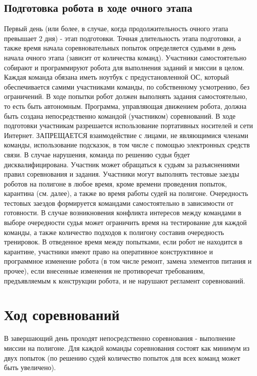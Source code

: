 \documentclass[12pt]{article}
\begin{document}
\subsection{Подготовка робота в ходе очного этапа} \hspace*{1cm}
Первый день (или более, в случае, когда продолжительность очного этапа превышает 2 дня) - этап подготовки. Точная длительность этапа подготовки, а также время начала соревновательных попыток определяется судьями в день начала очного этапа (зависит от количества команд).
Участники самостоятельно собирают и программируют робота для выполнения заданий и миссии в целом. Каждая команда обязана иметь ноутбук с предустановленной ОС, который обеспечивается самими участниками команды, по собственному усмотрению, без ограничений. В ходе попытки робот должен выполнять задания самостоятельно, то есть быть автономным.
Программа, управляющая движением робота, должна быть создана непосредственно командой (участником) соревнований. В ходе подготовки участникам разрешается использование портативных носителей и сети Интернет.
ЗАПРЕЩАЕТСЯ взаимодействие с лицами, не являющимися членами команды, использование подсказок, в том числе с помощью электронных средств связи. В случае нарушения, команда по решению судьи будет дисквалифицирована. Участник может обращаться к судьям за разъяснениями правил соревнования и задания.
Участники могут выполнять тестовые заезды роботов на полигоне в любое время, кроме времени проведения попыток, карантина (см. далее), а также во время работы судей на полигоне.
Очередность тестовых заездов формируется командами самостоятельно в зависимости от готовности. В случае возникновения конфликта интересов между командами в выборе очередности судья может ограничить время на тестирование для каждой команды, а также количество подходов к полигону составив очередность тренировок.
В отведенное время между попытками, если робот не находится в карантине, участники имеют право на оперативное конструктивное и программное изменение робота (в том числе ремонт, замена элементов питания и прочее), если внесенные изменения не противоречат требованиям, предъявляемым к конструкции робота, и не нарушают регламент соревнований.

\section{Ход соревнований} \hspace*{1cm}
В завершающий день проходят непосредственно соревнования -  выполнение миссии на полигоне. Для каждой команды соревнования состоят как минимум из двух попыток (по решению судей количество попыток для всех команд может быть увеличено).
\end{document}
